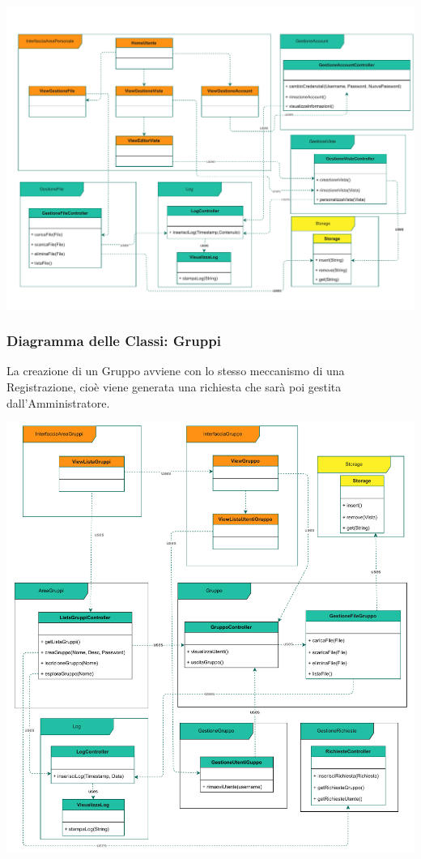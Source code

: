 \vspace{0.5cm}
\begin{adjustwidth}{-3.5cm}{0cm}
\includegraphics[scale=0.7]{classi/Package-Classi-Utente.drawio.pdf}
\end{adjustwidth}




\pagebreak
{}
\subsubsection*{Diagramma delle Classi: Gruppi}
\vspace{0.5cm}
La creazione di un Gruppo avviene con lo stesso meccanismo di una Registrazione, cioè viene generata una richiesta che sarà poi gestita dall'Amministratore.
\vspace{0.5cm}
\begin{adjustwidth}{-2.5cm}{0cm}
\includegraphics[scale=0.75]{classi/Package-Classi-Gruppi.drawio.pdf}
\end{adjustwidth}



